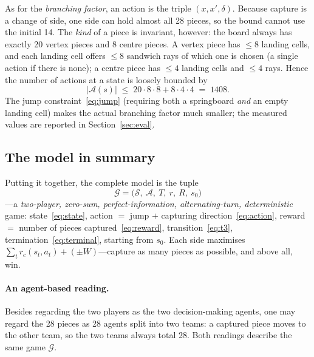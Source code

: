 As for the \emph{branching factor}, an action is the triple
$(x,x',\delta)$. Because capture is a change of side, one side can hold
almost all 28 pieces, so the bound cannot use the initial 14. The
\emph{kind} of a piece is invariant, however: the board always has exactly
20 vertex pieces and 8 centre pieces. A vertex piece has $\le 8$ landing
cells, and each landing cell offers $\le 8$ sandwich rays of which one is
chosen (a single action if there is none); a centre piece has $\le 4$
landing cells and $\le 4$ rays. Hence the number of actions at a state is
loosely bounded by
\begin{equation}
|\mathcal A(s)| \;\le\; 20\cdot 8\cdot 8 + 8\cdot 4\cdot 4 \;=\; 1408 .
\label{eq:branchbound}
\end{equation}
The jump constraint~\eqref{eq:jump} (requiring both a springboard \emph{and}
an empty landing cell) makes the actual branching factor much smaller; the
measured values are reported in Section~\ref{sec:eval}.

\subsection{The model in summary}
\label{ssec:onelinerule}

Putting it together, the complete model is the tuple
\begin{equation}
\boxed{\;\mathcal G=\big(\mathcal S,\ \mathcal A,\ T,\ r,\ R,\ s_0\big)\;}
\label{eq:game}
\end{equation}
---a \emph{two-player, zero-sum, perfect-information, alternating-turn,
deterministic} game: state~\eqref{eq:state}, action $=$ jump $+$ capturing
direction~\eqref{eq:action}, reward $=$ number of pieces
captured~\eqref{eq:reward}, transition~\eqref{eq:t3},
termination~\eqref{eq:terminal}, starting from $s_0$. Each side maximises
$\sum_t r_c(s_t,a_t)+(\pm W)$---capture as many pieces as possible, and above
all, win.

\paragraph{An agent-based reading.} Besides regarding the two players as the
two decision-making agents, one may regard the 28 pieces as 28 agents split
into two teams: a captured piece moves to the other team, so the two teams
always total 28. Both readings describe the same game $\mathcal G$.
